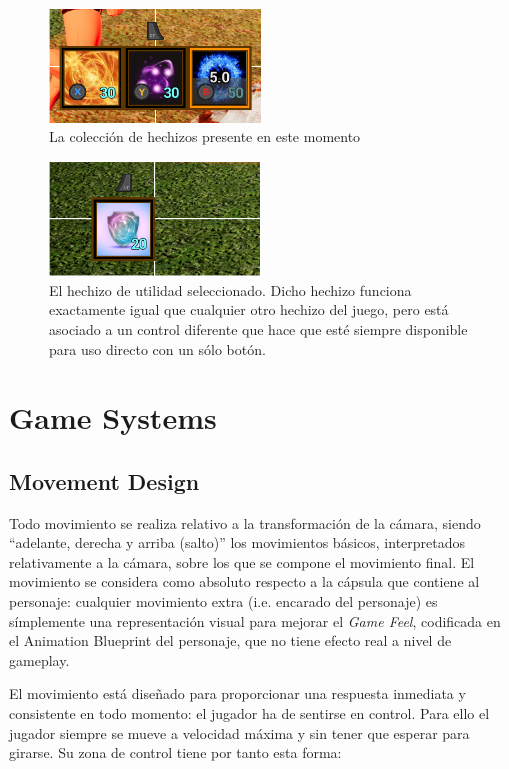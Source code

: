 \documentclass[12pt]{report}
\begin{document}
\begin{figure}[H]
    \centering
    \includegraphics[width=0.5\textwidth]{magic_ui}
    \caption{La colección de hechizos presente en este momento}
\end{figure}

\begin{figure}[H]
    \centering
    \includegraphics[width=0.5\textwidth]{magic_utility_ui}
    \caption{El hechizo de utilidad seleccionado. Dicho hechizo funciona exactamente igual que cualquier otro hechizo del juego, pero está asociado a un control diferente que hace que esté siempre disponible para uso directo con un sólo botón.}
\end{figure}

\chapter{Game Systems}

\section{Movement Design}

Todo movimiento se realiza relativo a la transformación de la cámara, siendo ``adelante, derecha y arriba (salto)'' los movimientos básicos, interpretados relativamente a la cámara, sobre los que se compone el movimiento final. El movimiento se considera como absoluto respecto a la cápsula que contiene al personaje: cualquier movimiento extra (i.e. encarado del personaje) es símplemente una representación visual para mejorar el \textit{Game Feel}, codificada en el Animation Blueprint del personaje, que no tiene efecto real a nivel de gameplay.

El movimiento está diseñado para proporcionar una respuesta inmediata y consistente en todo momento: el jugador ha de sentirse en control. Para ello el jugador siempre se mueve a velocidad máxima y sin tener que esperar para girarse. Su zona de control tiene por tanto esta forma:
\end{document}
